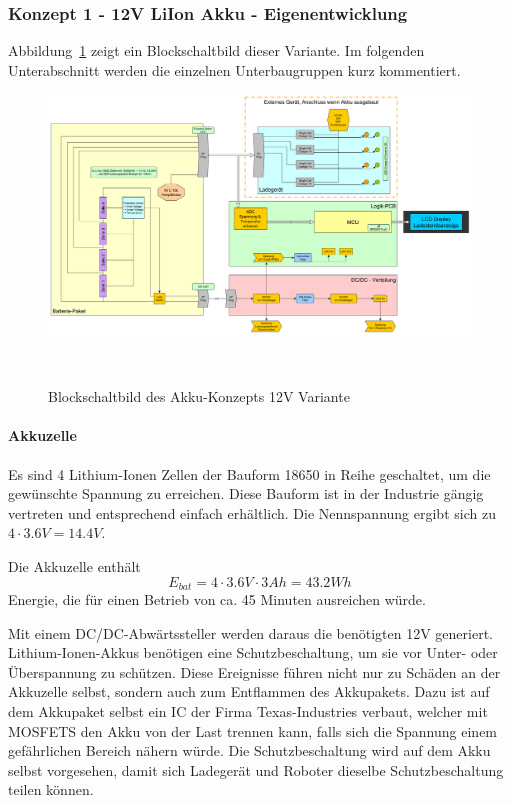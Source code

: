 \documentclass[main.tex]{subfiles} %
\begin{document}
\subsubsection*{Konzept 1 - 12V LiIon Akku - Eigenentwicklung}

Abbildung~\ref{fig:Konzept_12V_Eigenentw} zeigt ein Blockschaltbild dieser
Variante. Im folgenden Unterabschnitt werden die einzelnen Unterbaugruppen kurz
kommentiert.

\begin{figure}[h!]
    \centering
    \includegraphics[width=1\textwidth]{./fig_Boardnetz/SpeisungsKonzept_LiIon_12V.pdf}
    \caption{Blockschaltbild des Akku-Konzepts 12V Variante}~\label{fig:Konzept_12V_Eigenentw}
\end{figure}

\paragraph{Akkuzelle}
Es sind 4 Lithium-Ionen Zellen der Bauform 18650 in Reihe geschaltet, um die
gewünschte Spannung zu erreichen. Diese Bauform ist in der Industrie gängig
vertreten und entsprechend einfach erhältlich. Die Nennspannung ergibt sich zu
$4 \cdot 3.6V = 14.4V$.

Die Akkuzelle enthält
\[
    E_{bat} = 4 \cdot 3.6V \cdot 3Ah = 43.2Wh
\]
Energie, die für einen Betrieb von ca. 45 Minuten ausreichen würde.

Mit einem DC/DC-Abwärtssteller werden daraus die benötigten 12V generiert.
Lithium-Ionen-Akkus benötigen eine Schutzbeschaltung, um sie vor Unter- oder
Überspannung zu schützen. Diese Ereignisse führen nicht nur zu Schäden an der
Akkuzelle selbst, sondern auch zum Entflammen des Akkupakets. Dazu ist auf dem
Akkupaket selbst ein IC der Firma Texas-Industries verbaut, welcher mit MOSFETS
den Akku von der Last trennen kann, falls sich die Spannung einem gefährlichen
Bereich nähern würde. Die Schutzbeschaltung wird auf dem Akku selbst
vorgesehen, damit sich Ladegerät und Roboter dieselbe Schutzbeschaltung teilen
können.
\end{document}
